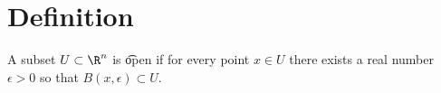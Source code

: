 

\section*{Definition}


A subset $U \subset \R ^n$ is \t{open} if for every point $x \in U$ there exists a real number $\epsilon  > 0$ so that $B(x, \epsilon ) \subset U$.

\blankpage